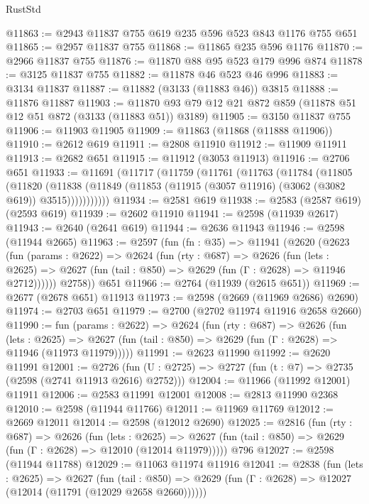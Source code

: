 \begin{lexlean}{RustStd}
\begin{coremodule}
@11863 := @2943 @11837 @755 @619 @235 @596 @523 @843 @1176 @755 @651
@11865 := @2957 @11837 @755
@11868 := @11865 @235 @596 @1176
@11870 := @2966 @11837 @755
@11876 := @11870 @88 @95 @523 @179 @996 @874
@11878 := @3125 @11837 @755
@11882 := @11878 @46 @523 @46 @996
@11883 := @3134 @11837
@11887 := @11882 (@3133 (@11883 @46)) @3815
@11888 := @11876 @11887
@11903 := @11870 @93 @79 @12 @21 @872 @859 (@11878 @51 @12 @51 @872 (@3133 (@11883 @51)) @3189)
@11905 := @3150 @11837 @755
@11906 := @11903 @11905
@11909 := @11863 (@11868 (@11888 @11906))
@11910 := @2612 @619
@11911 := @2808 @11910
@11912 := @11909 @11911
@11913 := @2682 @651
@11915 := @11912 (@3053 @11913)
@11916 := @2706 @651
@11933 := @11691
    (@11717
      (@11759
        (@11761
          (@11763
            (@11784
              (@11805
                (@11820
                  (@11838
                    (@11849 (@11853 (@11915 (@3057 @11916) (@3062 (@3082 @619)) @3515)))))))))))
@11934 := @2581 @619
@11938 := @2583 (@2587 @619) (@2593 @619)
@11939 := @2602 @11910
@11941 := @2598 (@11939 @2617)
@11943 := @2640 (@2641 @619)
@11944 := @2636 @11943
@11946 := @2598 (@11944 @2665)
@11963 := @2597
    (fun (fn : @35) =>
    @11941
      (@2620
        (@2623
          (fun (params : @2622) =>
          @2624
            (fun (rty : @687) =>
            @2626
              (fun (lets : @2625) =>
              @2627 (fun (tail : @850) => @2629 (fun (Γ : @2628) => @11946 @2712))))))
        @2758))
    @651
@11966 := @2764 (@11939 (@2615 @651))
@11969 := @2677 (@2678 @651) @11913
@11973 := @2598 (@2669 (@11969 @2686) @2690)
@11974 := @2703 @651
@11979 := @2700 (@2702 @11974 @11916 @2658 @2660)
@11990 := fun (params : @2622) =>
  @2624
    (fun (rty : @687) =>
    @2626
      (fun (lets : @2625) =>
      @2627 (fun (tail : @850) => @2629 (fun (Γ : @2628) => @11946 (@11973 @11979)))))
@11991 := @2623 @11990
@11992 := @2620 @11991
@12001 := @2726
    (fun (U : @2725) => @2727 (fun (t : @7) => @2735 (@2598 (@2741 @11913 @2616) @2752)))
@12004 := @11966 (@11992 @12001) @11911
@12006 := @2583 @11991 @12001
@12008 := @2813 @11990 @2368
@12010 := @2598 (@11944 @11766)
@12011 := @11969 @11769
@12012 := @2669 @12011
@12014 := @2598 (@12012 @2690)
@12025 := @2816
    (fun (rty : @687) =>
    @2626
      (fun (lets : @2625) =>
      @2627 (fun (tail : @850) => @2629 (fun (Γ : @2628) => @12010 (@12014 @11979)))))
    @796
@12027 := @2598 (@11944 @11788)
@12029 := @11063 @11974 @11916
@12041 := @2838
    (fun (lets : @2625) =>
    @2627
      (fun (tail : @850) =>
      @2629 (fun (Γ : @2628) => @12027 (@12014 (@11791 (@12029 @2658 @2660))))))

\end{coremodule}
\end{lexlean}
